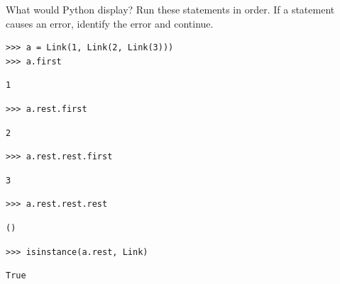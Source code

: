 \question What would Python display? Run these statements in order.
If a statement causes an error, identify the error and continue.

\begin{blocksection}
\begin{lstlisting}
>>> a = Link(1, Link(2, Link(3)))
>>> a.first
\end{lstlisting}
\begin{solution}[.35in]
\begin{lstlisting}
1
\end{lstlisting}
\end{solution}
\end{blocksection}

\begin{blocksection}
\begin{lstlisting}
>>> a.rest.first
\end{lstlisting}
\begin{solution}[.35in]
\begin{lstlisting}
2
\end{lstlisting}
\end{solution}
\end{blocksection}

\begin{blocksection}
\begin{lstlisting}
>>> a.rest.rest.first
\end{lstlisting}
\begin{solution}[.35in]
\begin{lstlisting}
3
\end{lstlisting}
\end{solution}
\end{blocksection}

\begin{blocksection}
\begin{lstlisting}
>>> a.rest.rest.rest
\end{lstlisting}
\begin{solution}[.35in]
\begin{lstlisting}
()
\end{lstlisting}
\end{solution}
\end{blocksection}

\begin{blocksection}
\begin{lstlisting}
>>> isinstance(a.rest, Link)
\end{lstlisting}
\begin{solution}[.35in]
\begin{lstlisting}
True
\end{lstlisting}
\end{solution}
\end{blocksection}


